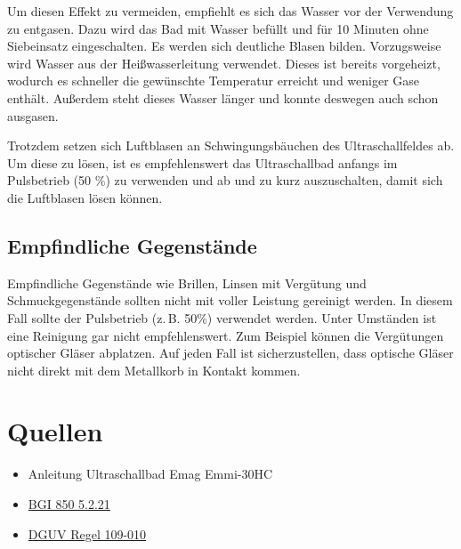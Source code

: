 \documentclass{\basedir/fablab-document}
\begin{document}
Um diesen Effekt zu vermeiden, empfiehlt es sich das Wasser vor der Verwendung zu entgasen.
Dazu wird das Bad mit Wasser befüllt und für 10 Minuten ohne Siebeinsatz eingeschalten.
Es werden sich deutliche Blasen bilden.
Vorzugsweise wird Wasser aus der Heißwasserleitung verwendet.
Dieses ist bereits vorgeheizt, wodurch es schneller die gewünschte Temperatur erreicht und weniger Gase enthält.
Außerdem steht dieses Wasser länger und konnte deswegen auch schon ausgasen.

Trotzdem setzen sich Luftblasen an Schwingungsbäuchen des Ultraschallfeldes ab.
Um diese zu lösen, ist es empfehlenswert das Ultraschallbad anfangs im Pulsbetrieb (50 \%) zu verwenden und ab und zu kurz auszuschalten, damit sich die Luftblasen lösen können.

\subsection{Empfindliche Gegenstände}
Empfindliche Gegenstände wie Brillen, Linsen mit Vergütung und Schmuckgegenstände sollten nicht mit voller Leistung gereinigt werden.
In diesem Fall sollte der Pulsbetrieb (z.\,B. 50\%) verwendet werden.
Unter Umständen ist eine Reinigung gar nicht empfehlenswert.
Zum Beispiel können die Vergütungen optischer Gläser abplatzen.
Auf jeden Fall ist sicherzustellen, dass optische Gläser nicht direkt mit dem Metallkorb in Kontakt kommen.

 \section{Quellen}
  \begin{itemize}
   \item Anleitung Ultraschallbad Emag Emmi-30HC
   \item \href{http://bgi850-0.vur.jedermann.de/index.jsp?isbn=bgi850-0&alias=bgc_bi850_0_bi850_0_s5_2_21_}{BGI 850 5.2.21}
   \item \href{http://www.arbeitssicherheit.de/de/html/library/document/4989034,37}{DGUV Regel 109-010}
  \end{itemize}


\end{document}
